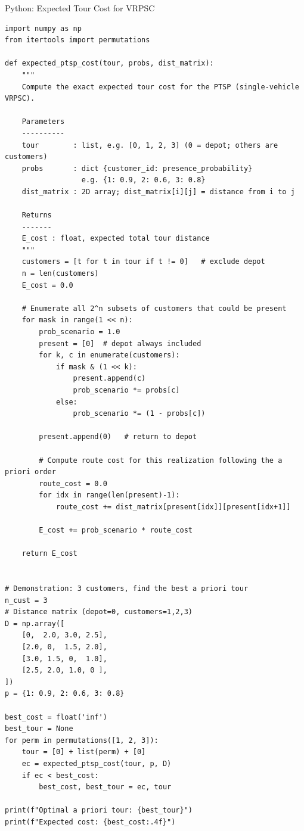 \documentclass[aspectratio=169,10pt]{beamer}
\begin{document}
\begin{frame}[fragile]{Python: Expected Tour Cost for VRPSC}
\begin{lstlisting}
import numpy as np
from itertools import permutations

def expected_ptsp_cost(tour, probs, dist_matrix):
    """
    Compute the exact expected tour cost for the PTSP (single-vehicle VRPSC).

    Parameters
    ----------
    tour        : list, e.g. [0, 1, 2, 3] (0 = depot; others are customers)
    probs       : dict {customer_id: presence_probability}
                  e.g. {1: 0.9, 2: 0.6, 3: 0.8}
    dist_matrix : 2D array; dist_matrix[i][j] = distance from i to j

    Returns
    -------
    E_cost : float, expected total tour distance
    """
    customers = [t for t in tour if t != 0]   # exclude depot
    n = len(customers)
    E_cost = 0.0

    # Enumerate all 2^n subsets of customers that could be present
    for mask in range(1 << n):
        prob_scenario = 1.0
        present = [0]  # depot always included
        for k, c in enumerate(customers):
            if mask & (1 << k):
                present.append(c)
                prob_scenario *= probs[c]
            else:
                prob_scenario *= (1 - probs[c])

        present.append(0)   # return to depot

        # Compute route cost for this realization following the a priori order
        route_cost = 0.0
        for idx in range(len(present)-1):
            route_cost += dist_matrix[present[idx]][present[idx+1]]

        E_cost += prob_scenario * route_cost

    return E_cost


# Demonstration: 3 customers, find the best a priori tour
n_cust = 3
# Distance matrix (depot=0, customers=1,2,3)
D = np.array([
    [0,  2.0, 3.0, 2.5],
    [2.0, 0,  1.5, 2.0],
    [3.0, 1.5, 0,  1.0],
    [2.5, 2.0, 1.0, 0 ],
])
p = {1: 0.9, 2: 0.6, 3: 0.8}

best_cost = float('inf')
best_tour = None
for perm in permutations([1, 2, 3]):
    tour = [0] + list(perm) + [0]
    ec = expected_ptsp_cost(tour, p, D)
    if ec < best_cost:
        best_cost, best_tour = ec, tour

print(f"Optimal a priori tour: {best_tour}")
print(f"Expected cost: {best_cost:.4f}")
\end{lstlisting}
\end{frame}
\end{document}
